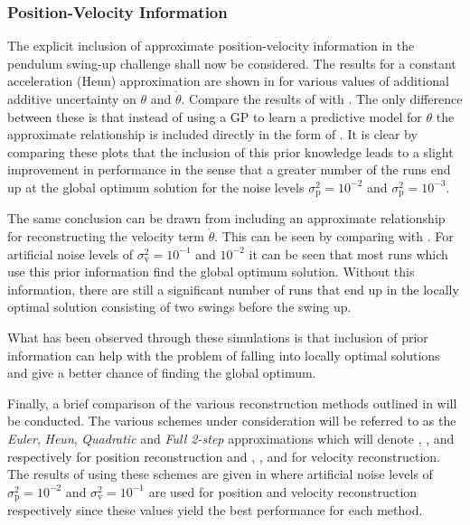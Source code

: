 




\subsubsection{Position-Velocity Information}
The explicit inclusion of approximate position-velocity information in the pendulum swing-up challenge shall now be considered. The results for a constant acceleration (Heun) approximation are shown in  for various values of additional additive uncertainty on $\theta$ and $\dot\theta$. Compare the results of  with . The only difference between these is that instead of using a GP to learn a predictive model for $\theta$ the approximate relationship is included directly in the form of . It is clear by comparing these plots that the inclusion of this prior knowledge leads to a slight improvement in performance in the sense that a greater number of the runs end up at the global optimum solution for the noise levels $\sigma_{\text{p}}^2 = 10^{-2}$ and $\sigma_{\text{p}}^2 = 10^{-3}$.


The same conclusion can be drawn from including an approximate relationship for reconstructing the velocity term $\dot\theta$. This can be seen by comparing  with . For artificial noise levels of $\sigma_{\text{v}}^2 = 10^{-1}$ and $10^{-2}$ it can be seen that most runs which use this prior information find the global optimum solution. Without this information, there are still a significant number of runs that end up in the locally optimal solution consisting of two swings before the swing up.


What has been observed through these simulations is that inclusion of prior information can help with the problem of falling into locally optimal solutions and give a better chance of finding the global optimum.



Finally, a brief comparison of the various reconstruction methods outlined in  will be conducted. The various schemes under consideration will be referred to as the \textit{Euler}, \textit{Heun}, \textit{Quadratic} and \textit{Full 2-step} approximations which will denote , ,  and  respectively for position reconstruction and , ,  and  for velocity reconstruction. The results of using these schemes are given in  where artificial noise levels of $\sigma_{\text{p}}^2 = 10^{-2}$ and $\sigma_{\text{v}}^2 = 10^{-1}$ are used for position and velocity reconstruction respectively since these values yield the best performance for each method.

